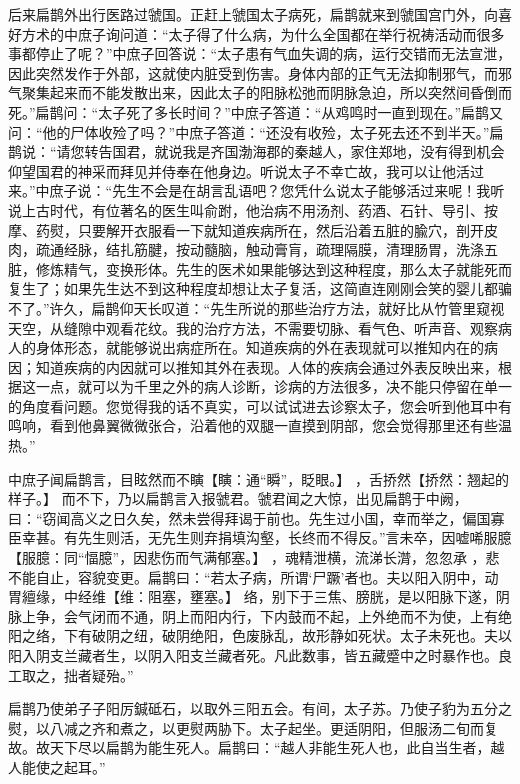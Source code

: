 \documentclass[12pt,UTF8]{ctexbook}
\begin{document}
后来扁鹊外出行医路过虢国。正赶上虢国太子病死，扁鹊就来到虢国宫门外，向喜好方术的中庶子询问道：“太子得了什么病，为什么全国都在举行祝祷活动而很多事都停止了呢？”中庶子回答说：“太子患有气血失调的病，运行交错而无法宣泄，因此突然发作于外部，这就使内脏受到伤害。身体内部的正气无法抑制邪气，而邪气聚集起来而不能发散出来，因此太子的阳脉松弛而阴脉急迫，所以突然间昏倒而死。”扁鹊问：“太子死了多长时间？”中庶子答道：“从鸡鸣时一直到现在。”扁鹊又问：“他的尸体收殓了吗？”中庶子答道：“还没有收殓，太子死去还不到半天。”扁鹊说：“请您转告国君，就说我是齐国渤海郡的秦越人，家住郑地，没有得到机会仰望国君的神采而拜见并侍奉在他身边。听说太子不幸亡故，我可以让他活过来。”中庶子说：“先生不会是在胡言乱语吧？您凭什么说太子能够活过来呢！我听说上古时代，有位著名的医生叫俞跗，他治病不用汤剂、药酒、石针、导引、按摩、药熨，只要解开衣服看一下就知道疾病所在，然后沿着五脏的腧穴，剖开皮肉，疏通经脉，结扎筋腱，按动髓脑，触动膏肓，疏理隔膜，清理肠胃，洗涤五脏，修炼精气，变换形体。先生的医术如果能够达到这种程度，那么太子就能死而复生了；如果先生达不到这种程度却想让太子复活，这简直连刚刚会笑的婴儿都骗不了。”许久，扁鹊仰天长叹道：“先生所说的那些治疗方法，就好比从竹管里窥视天空，从缝隙中观看花纹。我的治疗方法，不需要切脉、看气色、听声音、观察病人的身体形态，就能够说出病症所在。知道疾病的外在表现就可以推知内在的病因；知道疾病的内因就可以推知其外在表现。人体的疾病会通过外表反映出来，根据这一点，就可以为千里之外的病人诊断，诊病的方法很多，决不能只停留在单一的角度看问题。您觉得我的话不真实，可以试试进去诊察太子，您会听到他耳中有鸣响，看到他鼻翼微微张合，沿着他的双腿一直摸到阴部，您会觉得那里还有些温热。”

中庶子闻扁鹊言，目眩然而不瞚【瞚：通“瞬”，眨眼。】 ，舌挢然【挢然：翘起的样子。】 而不下，乃以扁鹊言入报虢君。虢君闻之大惊，出见扁鹊于中阙，曰：“窃闻高义之日久矣，然未尝得拜谒于前也。先生过小国，幸而举之，偏国寡臣幸甚。有先生则活，无先生则弃捐填沟壑，长终而不得反。”言未卒，因嘘唏服臆【服臆：同“愊臆”，因悲伤而气满郁塞。】 ，魂精泄横，流涕长潸，忽忽承 ，悲不能自止，容貌变更。扁鹊曰：“若太子病，所谓‘尸蹶’者也。夫以阳入阴中，动胃繵缘，中经维【维：阻塞，壅塞。】 络，别下于三焦、膀胱，是以阳脉下遂，阴脉上争，会气闭而不通，阴上而阳内行，下内鼓而不起，上外绝而不为使，上有绝阳之络，下有破阴之纽，破阴绝阳，色废脉乱，故形静如死状。太子未死也。夫以阳入阴支兰藏者生，以阴入阳支兰藏者死。凡此数事，皆五藏蹙中之时暴作也。良工取之，拙者疑殆。”

扁鹊乃使弟子子阳厉鍼砥石，以取外三阳五会。有间，太子苏。乃使子豹为五分之熨，以八减之齐和煮之，以更熨两胁下。太子起坐。更适阴阳，但服汤二旬而复故。故天下尽以扁鹊为能生死人。扁鹊曰：“越人非能生死人也，此自当生者，越人能使之起耳。”
\end{document}
